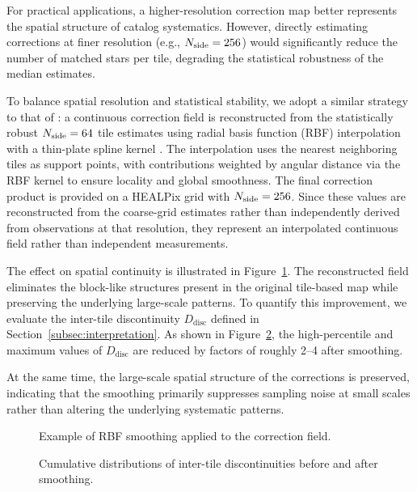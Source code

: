 \documentclass[linenumbers,amsmath,manuscript]{aastex702}
\begin{document}
For practical applications, a higher-resolution correction map better represents the spatial structure of catalog systematics. However, directly estimating corrections at finer resolution (e.g., $N_{\rm side}=256$) would significantly reduce the number of matched stars per tile, degrading the statistical robustness of the median estimates.

To balance spatial resolution and statistical stability, we adopt a similar strategy to that of \citet{Eggl2020}: a continuous correction field is reconstructed from the statistically robust $N_{\rm side}=64$ tile estimates using radial basis function (RBF) interpolation with a thin-plate spline kernel \citep{Wahba1990,Schaback1995}. The interpolation uses the nearest neighboring tiles as support points, with contributions weighted by angular distance via the RBF kernel to ensure locality and global smoothness. The final correction product is provided on a HEALPix grid with $N_{\rm side}=256$. Since these values are reconstructed from the coarse-grid estimates rather than independently derived from observations at that resolution, they represent an interpolated continuous field rather than independent measurements.

The effect on spatial continuity is illustrated in Figure~\ref{fig:bias_ucac4_zoom_compare_n256}. The reconstructed field eliminates the block-like structures present in the original tile-based map while preserving the underlying large-scale patterns. To quantify this improvement, we evaluate the inter-tile discontinuity $D_{\mathrm{disc}}$ defined in Section~\ref{subsec:interpretation}. As shown in Figure~\ref{fig:bias_jump}, the high-percentile and maximum values of $D_{\mathrm{disc}}$ are reduced by factors of roughly 2--4 after smoothing.

At the same time, the large-scale spatial structure of the corrections is preserved, indicating that the smoothing primarily suppresses sampling noise at small scales rather than altering the underlying systematic patterns.

\begin{figure}[ht!]
\caption{Example of RBF smoothing applied to the correction field.}
\label{fig:bias_ucac4_zoom_compare_n256}
\end{figure}

\begin{figure}[ht!]
\caption{Cumulative distributions of inter-tile discontinuities before and after smoothing.}
\label{fig:bias_jump}
\end{figure}
\end{document}
